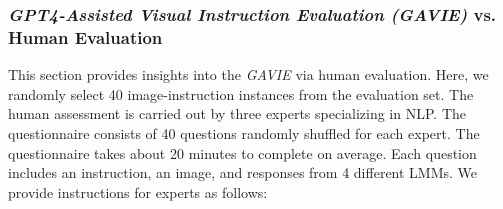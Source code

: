 

\subsubsection{\textit{GPT4-Assisted Visual Instruction Evaluation (GAVIE)} vs. Human Evaluation}

This section provides insights into the \textit{GAVIE} via human evaluation. Here, we randomly select 40 image-instruction instances from the evaluation set. The human assessment is carried out by three experts specializing in NLP. The questionnaire consists of 40 questions randomly shuffled for each expert. The questionnaire takes about 20 minutes to complete on average. Each question includes an instruction, an image, and responses from 4 different LMMs. We provide instructions for experts as follows: 

